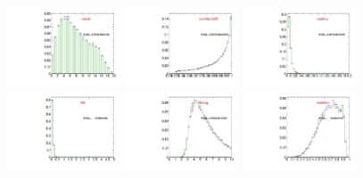 \begin{figure}
  \centering
  \includegraphics[width=0.3\textwidth]{Figures/VariablesComparison/Data_endcaps_figs_3h/ntrk20}
  \includegraphics[width=0.3\textwidth]{Figures/VariablesComparison/Data_endcaps_figs_3h/cosAlpha3D}
  \includegraphics[width=0.3\textwidth]{Figures/VariablesComparison/Data_endcaps_figs_3h/minDca}
  \includegraphics[width=0.3\textwidth]{Figures/VariablesComparison/Data_endcaps_figs_3h/l3d}
  \includegraphics[width=0.3\textwidth]{Figures/VariablesComparison/Data_endcaps_figs_3h/l3dsig}
  \includegraphics[width=0.3\textwidth]{Figures/VariablesComparison/Data_endcaps_figs_3h/isolation}

\end{figure}

